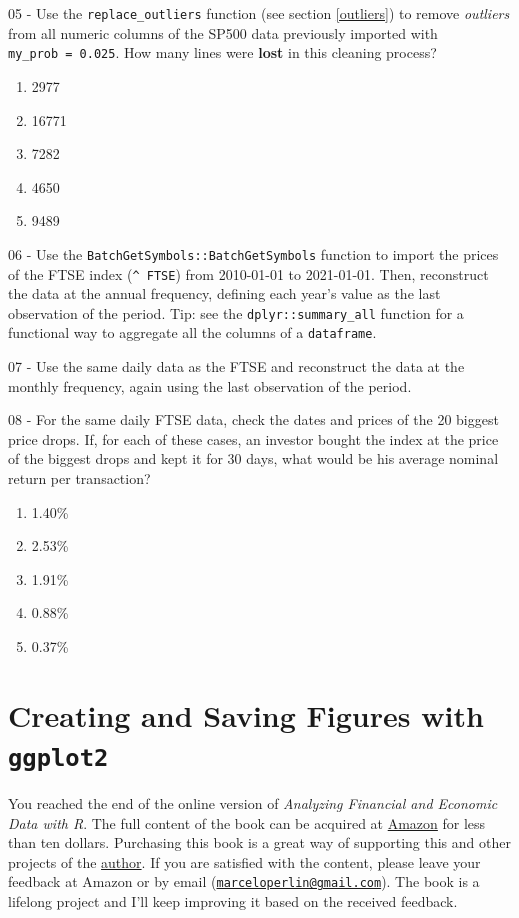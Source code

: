 \documentclass[
  12pt,
]{book}
\providecommand{\tightlist}{%
  \setlength{\itemsep}{0pt}\setlength{\parskip}{0pt}}
\newenvironment{pleasebuyit}
{\begin{noteblock}
		
	} {\end{noteblock}}
\begin{document}
05 -
Use the \texttt{replace\_outliers} function (see section \ref{outliers}) to remove \emph{outliers} from all numeric columns of the SP500 data previously imported with \texttt{my\_prob\ =\ 0.025}. How many lines were \textbf{lost} in this cleaning process?

\begin{enumerate}
\def\labelenumi{\alph{enumi})}
\tightlist
\item
  2977
\item
  16771
\item
  7282
\item
  4650
\item
  9489
\end{enumerate}

06 -
Use the \texttt{BatchGetSymbols::BatchGetSymbols} function to import the prices of the FTSE index (\texttt{\textquotesingle{}\^{}\ FTSE\textquotesingle{}}) from 2010-01-01 to 2021-01-01. Then, reconstruct the data at the annual frequency, defining each year's value as the last observation of the period. Tip: see the \texttt{dplyr::summary\_all} function for a functional way to aggregate all the columns of a \texttt{dataframe}.

07 -
Use the same daily data as the FTSE and reconstruct the data at the monthly frequency, again using the last observation of the period.

08 -
For the same daily FTSE data, check the dates and prices of the 20 biggest price drops. If, for each of these cases, an investor bought the index at the price of the biggest drops and kept it for 30 days, what would be his average nominal return per transaction?

\begin{enumerate}
\def\labelenumi{\alph{enumi})}
\tightlist
\item
  1.40\%
\item
  2.53\%
\item
  1.91\%
\item
  0.88\%
\item
  0.37\%
\end{enumerate}

\hypertarget{figures}{%
\chapter{\texorpdfstring{Creating and Saving Figures with \texttt{ggplot2}}{Creating and Saving Figures with ggplot2}}\label{figures}}

\begin{pleasebuyit}
You reached the end of the online version of \emph{Analyzing Financial
and Economic Data with R}. The full content of the book can be acquired
at \href{https://www.amazon.com/dp/B084LSNXMN}{Amazon} for less than ten
dollars. Purchasing this book is a great way of supporting this and
other projects of the \href{https://www.msperlin.com/blog/}{author}. If
you are satisfied with the content, please leave your feedback at Amazon
or by email
(\href{mailto:marceloperlin@gmail.com}{\nolinkurl{marceloperlin@gmail.com}}).
The book is a lifelong project and I'll keep improving it based on the
received feedback.
\end{pleasebuyit}
\end{document}

